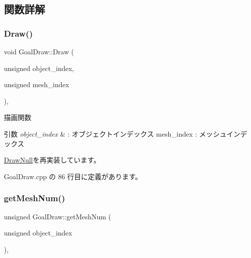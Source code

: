 \subsection{関数詳解}
\mbox{\label{class_goal_draw_a554c826d7a4534ee489dfe18edf7ee0e}} 
\subsubsection{\texorpdfstring{Draw()}{Draw()}}
{\footnotesize\ttfamily void Goal\+Draw\+::\+Draw (\begin{DoxyParamCaption}\item[{unsigned}]{object\+\_\+index,  }\item[{unsigned}]{mesh\+\_\+index }\end{DoxyParamCaption})\hspace{0.3cm}{\ttfamily [override]}, {\ttfamily [virtual]}}



描画関数 


\begin{DoxyParams}{引数}
{\em object\+\_\+index} & \+: オブジェクトインデックス mesh\+\_\+index \+: メッシュインデックス \\
\hline
\end{DoxyParams}


\mbox{\hyperlink{class_draw_null_afe50f6fd820b18d673f70f048743f339}{Draw\+Null}}を再実装しています。



 Goal\+Draw.\+cpp の 86 行目に定義があります。

\mbox{\label{class_goal_draw_ac80c8da78cda7b15a4ce46f7d7057622}} 
\subsubsection{\texorpdfstring{get\+Mesh\+Num()}{getMeshNum()}}
{\footnotesize\ttfamily unsigned Goal\+Draw\+::get\+Mesh\+Num (\begin{DoxyParamCaption}\item[{unsigned}]{object\+\_\+index }\end{DoxyParamCaption})\hspace{0.3cm}{\ttfamily [override]}, {\ttfamily [virtual]}}



